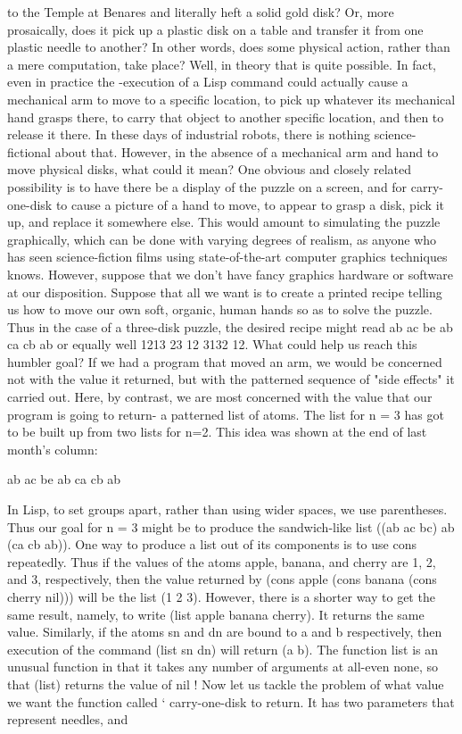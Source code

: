 to the Temple at Benares and literally heft a solid gold disk? Or, more prosaically,
does it pick up a plastic disk on a table and transfer it from one plastic needle to
another? In other words, does some physical action, rather than a mere computation,
take place?
        Well, in theory that is quite possible. In fact, even in practice the -execution of
a Lisp command could actually cause a mechanical arm to move to a specific
location, to pick up whatever its mechanical hand grasps there, to carry that object to
another specific location, and then to release it there. In these days of industrial
robots, there is nothing science-fictional about that. However, in the absence of a
mechanical arm and hand to move physical disks, what could it mean?
        One obvious and closely related possibility is to have there be a display of the
puzzle on a screen, and for carry-one-disk to cause a picture of a hand to move, to
appear to grasp a disk, pick it up, and replace it somewhere else. This would amount
to simulating the puzzle graphically, which can be done with varying degrees of
realism, as anyone who has seen science-fiction films using state-of-the-art computer
graphics techniques knows.
        However, suppose that we don't have fancy graphics hardware or software at
our disposition. Suppose that all we want is to create a printed recipe telling us how to
move our own soft, organic, human hands so as to solve the puzzle. Thus in the case
of a three-disk puzzle, the desired recipe might read ab ac be ab ca cb ab or equally
well 1213 23 12 3132 12. What could help us reach this humbler goal?
        If we had a program that moved an arm, we would be concerned not with the
value it returned, but with the patterned sequence of "side effects" it carried out. Here,
by contrast, we are most concerned with the value that our program is going to return-
a patterned list of atoms. The list for n = 3 has got to be built up from two lists for
n=2. This idea was shown at the end of last month's column:

                       ab ac be ab ca cb ab

        In Lisp, to set groups apart, rather than using wider spaces, we use
parentheses. Thus our goal for n = 3 might be to produce the sandwich-like list ((ab
ac bc) ab (ca cb ab)). One way to produce a list out of its components is to use cons
repeatedly. Thus if the values of the atoms apple, banana, and cherry are 1, 2, and 3,
respectively, then the value returned by (cons apple (cons banana (cons cherry
nil))) will be the list (1 2 3). However, there is a shorter way to get the same result,
namely, to write (list apple banana cherry). It returns the same value. Similarly, if
the atoms sn and dn are bound to a and b respectively, then execution of the
command (list sn dn) will return (a b). The function list is an unusual function in that
it takes any number of arguments at all-even none, so that (list) returns the value of
nil !
        Now let us tackle the problem of what value we want the function called `
carry-one-disk to return. It has two parameters that represent needles, and




